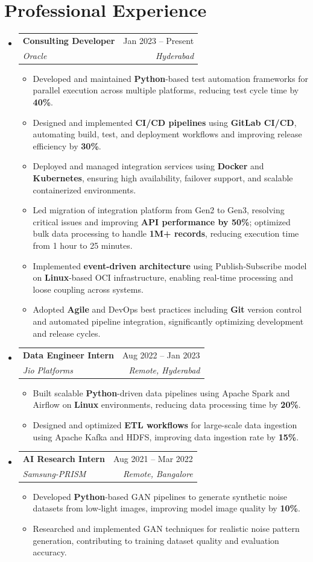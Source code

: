 \documentclass[letterpaper,11pt]{article}
\makeatletter
\newcommand{\resumeItem}[1]{
  \item\small{
    {#1 \vspace{-2pt}}
  }
}
\newcommand{\resumeSubheading}[4]{
  \vspace{-2pt}\item
    \begin{tabular*}{0.97\textwidth}[t]{l@{\extracolsep{\fill}}r}
      \textbf{#1} & #2 \\
      \textit{\small#3} & \textit{\small #4} \\
    \end{tabular*}\vspace{-7pt}
}
\newcommand{\resumeSubHeadingListStart}{\begin{itemize}[leftmargin=0.15in, label={}]}
\newcommand{\resumeSubHeadingListEnd}{\end{itemize}}
\newcommand{\resumeItemListStart}{\begin{itemize}}
\newcommand{\resumeItemListEnd}{\end{itemize}\vspace{-5pt}}
\makeatother
\begin{document}
\section{Professional Experience}
\resumeSubHeadingListStart
    \resumeSubheading
      {Consulting Developer}{Jan 2023 -- Present}
      {Oracle}{Hyderabad}
      \resumeItemListStart
        \resumeItem{Developed and maintained \textbf{Python}-based test automation frameworks for parallel execution across multiple platforms, reducing test cycle time by \textbf{40\%}.}
        \resumeItem{Designed and implemented \textbf{CI/CD pipelines} using \textbf{GitLab CI/CD}, automating build, test, and deployment workflows and improving release efficiency by \textbf{30\%}.}
        \resumeItem{Deployed and managed integration services using \textbf{Docker} and \textbf{Kubernetes}, ensuring high availability, failover support, and scalable containerized environments.}
        \resumeItem{Led migration of integration platform from Gen2 to Gen3, resolving critical issues and improving \textbf{API performance by 50\%}; optimized bulk data processing to handle \textbf{1M+ records}, reducing execution time from 1 hour to 25 minutes.}
        \resumeItem{Implemented \textbf{event-driven architecture} using Publish-Subscribe model on \textbf{Linux}-based OCI infrastructure, enabling real-time processing and loose coupling across systems.}
        \resumeItem{Adopted \textbf{Agile} and DevOps best practices including \textbf{Git} version control and automated pipeline integration, significantly optimizing development and release cycles.}
      \resumeItemListEnd
    \resumeSubheading
      {Data Engineer Intern}{Aug 2022 -- Jan 2023}
      {Jio Platforms}{Remote, Hyderabad}
      \resumeItemListStart
        \resumeItem{Built scalable \textbf{Python}-driven data pipelines using Apache Spark and Airflow on \textbf{Linux} environments, reducing data processing time by \textbf{20\%}.}
        \resumeItem{Designed and optimized \textbf{ETL workflows} for large-scale data ingestion using Apache Kafka and HDFS, improving data ingestion rate by \textbf{15\%}.}
      \resumeItemListEnd
    \resumeSubheading
      {AI Research Intern}{Aug 2021 -- Mar 2022}
      {Samsung-PRISM}{Remote, Bangalore}
      \resumeItemListStart
        \resumeItem{Developed \textbf{Python}-based GAN pipelines to generate synthetic noise datasets from low-light images, improving model image quality by \textbf{10\%}.}
        \resumeItem{Researched and implemented GAN techniques for realistic noise pattern generation, contributing to training dataset quality and evaluation accuracy.}
      \resumeItemListEnd
\resumeSubHeadingListEnd
\end{document}
